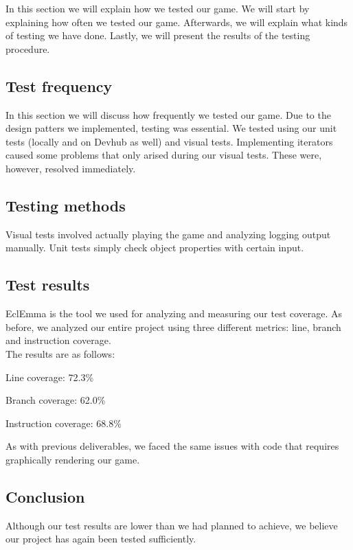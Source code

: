 \documentclass[a4paper,11pt,report]{scrartcl}
\begin{document}
In this section we will explain how we tested our game. We will start by
explaining how often we tested our game. Afterwards, we will explain what
kinds of testing we have done. Lastly, we will present the results of the
testing procedure.

\subsection{Test frequency}
In this section we will discuss how frequently we tested our game. Due to the
design patters we implemented, testing was essential. We tested using our
unit tests (locally and on Devhub as well) and visual tests. Implementing
iterators caused some problems that only arised during our visual tests. These
were, however, resolved immediately.

\subsection{Testing methods}
Visual tests involved actually playing the game and analyzing logging output
manually. Unit tests simply check object properties with certain input.

\subsection{Test results}
EclEmma is the tool we used for analyzing and measuring our test coverage.
As before, we analyzed our entire project using three different metrics: line,
branch and instruction coverage.\\

The results are as follows:
\begin{description}
	\item Line coverage: 72.3\%
	\item Branch coverage: 62.0\%
	\item Instruction coverage: 68.8\%
\end{description}
As with previous deliverables, we faced the same issues with code that requires
graphically rendering our game. 

\subsection{Conclusion}
Although our test results are lower than we had planned to achieve, we believe
our project has again been tested sufficiently.
\end{document}
